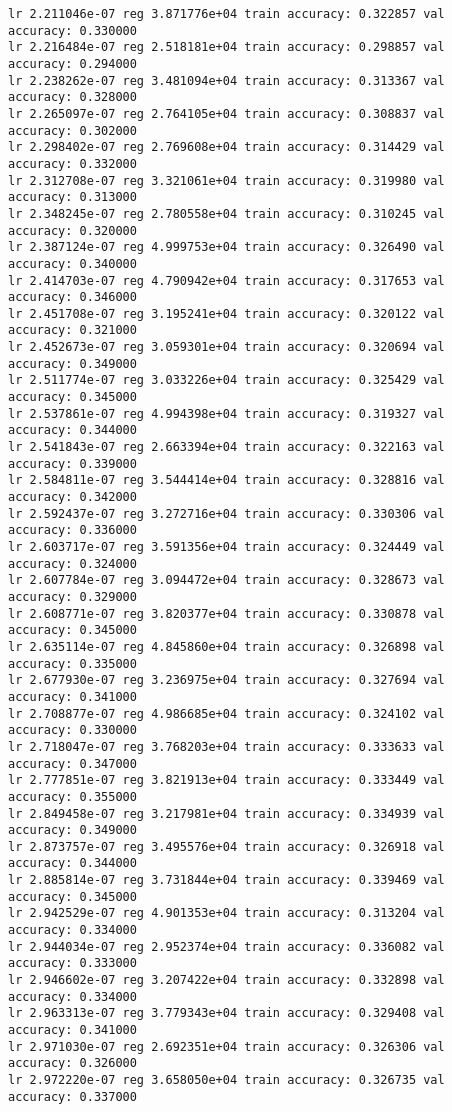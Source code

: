 \documentclass[11pt]{article}
\begin{document}
\begin{Verbatim}[commandchars=\\\{\}]
lr 2.211046e-07 reg 3.871776e+04 train accuracy: 0.322857 val accuracy: 0.330000
lr 2.216484e-07 reg 2.518181e+04 train accuracy: 0.298857 val accuracy: 0.294000
lr 2.238262e-07 reg 3.481094e+04 train accuracy: 0.313367 val accuracy: 0.328000
lr 2.265097e-07 reg 2.764105e+04 train accuracy: 0.308837 val accuracy: 0.302000
lr 2.298402e-07 reg 2.769608e+04 train accuracy: 0.314429 val accuracy: 0.332000
lr 2.312708e-07 reg 3.321061e+04 train accuracy: 0.319980 val accuracy: 0.313000
lr 2.348245e-07 reg 2.780558e+04 train accuracy: 0.310245 val accuracy: 0.320000
lr 2.387124e-07 reg 4.999753e+04 train accuracy: 0.326490 val accuracy: 0.340000
lr 2.414703e-07 reg 4.790942e+04 train accuracy: 0.317653 val accuracy: 0.346000
lr 2.451708e-07 reg 3.195241e+04 train accuracy: 0.320122 val accuracy: 0.321000
lr 2.452673e-07 reg 3.059301e+04 train accuracy: 0.320694 val accuracy: 0.349000
lr 2.511774e-07 reg 3.033226e+04 train accuracy: 0.325429 val accuracy: 0.345000
lr 2.537861e-07 reg 4.994398e+04 train accuracy: 0.319327 val accuracy: 0.344000
lr 2.541843e-07 reg 2.663394e+04 train accuracy: 0.322163 val accuracy: 0.339000
lr 2.584811e-07 reg 3.544414e+04 train accuracy: 0.328816 val accuracy: 0.342000
lr 2.592437e-07 reg 3.272716e+04 train accuracy: 0.330306 val accuracy: 0.336000
lr 2.603717e-07 reg 3.591356e+04 train accuracy: 0.324449 val accuracy: 0.324000
lr 2.607784e-07 reg 3.094472e+04 train accuracy: 0.328673 val accuracy: 0.329000
lr 2.608771e-07 reg 3.820377e+04 train accuracy: 0.330878 val accuracy: 0.345000
lr 2.635114e-07 reg 4.845860e+04 train accuracy: 0.326898 val accuracy: 0.335000
lr 2.677930e-07 reg 3.236975e+04 train accuracy: 0.327694 val accuracy: 0.341000
lr 2.708877e-07 reg 4.986685e+04 train accuracy: 0.324102 val accuracy: 0.330000
lr 2.718047e-07 reg 3.768203e+04 train accuracy: 0.333633 val accuracy: 0.347000
lr 2.777851e-07 reg 3.821913e+04 train accuracy: 0.333449 val accuracy: 0.355000
lr 2.849458e-07 reg 3.217981e+04 train accuracy: 0.334939 val accuracy: 0.349000
lr 2.873757e-07 reg 3.495576e+04 train accuracy: 0.326918 val accuracy: 0.344000
lr 2.885814e-07 reg 3.731844e+04 train accuracy: 0.339469 val accuracy: 0.345000
lr 2.942529e-07 reg 4.901353e+04 train accuracy: 0.313204 val accuracy: 0.334000
lr 2.944034e-07 reg 2.952374e+04 train accuracy: 0.336082 val accuracy: 0.333000
lr 2.946602e-07 reg 3.207422e+04 train accuracy: 0.332898 val accuracy: 0.334000
lr 2.963313e-07 reg 3.779343e+04 train accuracy: 0.329408 val accuracy: 0.341000
lr 2.971030e-07 reg 2.692351e+04 train accuracy: 0.326306 val accuracy: 0.326000
lr 2.972220e-07 reg 3.658050e+04 train accuracy: 0.326735 val accuracy: 0.337000

\end{Verbatim}
\end{document}
